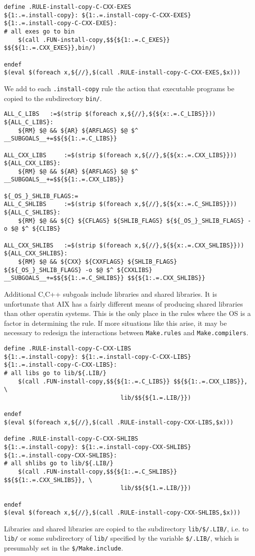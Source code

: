 \documentclass[letterpaper]{article}
\begin{document}
\begin{verbatim}
define .RULE-install-copy-C-CXX-EXES
${1:.=.install-copy}: ${1:.=.install-copy-C-CXX-EXES}
${1:.=.install-copy-C-CXX-EXES}:
# all exes go to bin
	$(call .FUN-install-copy,$${${1:.=.C_EXES}} $${${1:.=.CXX_EXES}},bin/)

endef
$(eval $(foreach x,${//},$(call .RULE-install-copy-C-CXX-EXES,$x)))
\end{verbatim}
We add to each \verb+.install-copy+ rule the action that executable
programs be copied to the subdirectory \verb+bin/+.

\begin{verbatim}
ALL_C_LIBS   :=$(strip $(foreach x,${//},${${x:.=.C_LIBS}}))
${ALL_C_LIBS}:
	${RM} $@ && ${AR} ${ARFLAGS} $@ $^
__SUBGOALS__+=$${${1:.=.C_LIBS}}

ALL_CXX_LIBS     :=$(strip $(foreach x,${//},${${x:.=.CXX_LIBS}}))
${ALL_CXX_LIBS}:
	${RM} $@ && ${AR} ${ARFLAGS} $@ $^
__SUBGOALS__+=$${${1:.=.CXX_LIBS}}

${_OS_}_SHLIB_FLAGS:=
ALL_C_SHLIBS     :=$(strip $(foreach x,${//},${${x:.=.C_SHLIBS}}))
${ALL_C_SHLIBS}:
	${RM} $@ && ${C} ${CFLAGS} ${SHLIB_FLAGS} ${${_OS_}_SHLIB_FLAGS} -o $@ $^ ${CLIBS}

ALL_CXX_SHLIBS   :=$(strip $(foreach x,${//},${${x:.=.CXX_SHLIBS}}))
${ALL_CXX_SHLIBS}:
	${RM} $@ && ${CXX} ${CXXFLAGS} ${SHLIB_FLAGS} ${${_OS_}_SHLIB_FLAGS} -o $@ $^ ${CXXLIBS}
__SUBGOALS__+=$${${1:.=.C_SHLIBS}} $${${1:.=.CXX_SHLIBS}}
\end{verbatim}
Additional C,C++ subgoals include libraries and shared libraries.  It is
unfortunate that AIX has a fairly different means of producing shared
libraries than other operatin systems.  This is the only place in the
rules where the OS is a factor in determining the rule.  If more situations
like this arise, it may be necessary to redesign the interactions
between \verb+Make.rules+ and \verb+Make.compilers+.

\begin{verbatim}
define .RULE-install-copy-C-CXX-LIBS
${1:.=.install-copy}: ${1:.=.install-copy-C-CXX-LIBS}
${1:.=.install-copy-C-CXX-LIBS}:
# all libs go to lib/${.LIB/}
	$(call .FUN-install-copy,$${${1:.=.C_LIBS}} $${${1:.=.CXX_LIBS}}, \
                                 lib/$${${1.=.LIB/}})

endef
$(eval $(foreach x,${//},$(call .RULE-install-copy-CXX-LIBS,$x)))

define .RULE-install-copy-C-CXX-SHLIBS
${1:.=.install-copy}: ${1:.=.install-copy-CXX-SHLIBS}
${1:.=.install-copy-CXX-SHLIBS}:
# all shlibs go to lib/${.LIB/}
	$(call .FUN-install-copy,$${${1:.=.C_SHLIBS}} $${${1:.=.CXX_SHLIBS}}, \
                                 lib/$${${1.=.LIB/}})

endef
$(eval $(foreach x,${//},$(call .RULE-install-copy-CXX-SHLIBS,$x)))
\end{verbatim}
Libraries and shared libraries are copied to the subdirectory
\verb+lib/$/.LIB/+, i.e. to \verb+lib/+ or some subdirectory of
\verb+lib/+ specified by the  variable \verb+$/.LIB/+, which is
presumably set in the \verb+$/Make.include+.
\end{document}
